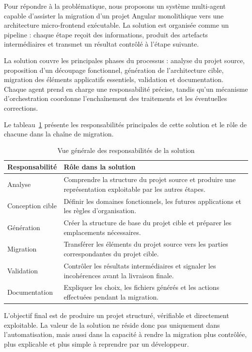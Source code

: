 Pour répondre à la problématique, nous proposons un système multi-agent capable d'assister la migration d'un projet Angular monolithique vers une architecture micro-frontend exécutable. La solution est organisée comme un pipeline : chaque étape reçoit des informations, produit des artefacts intermédiaires et transmet un résultat contrôlé à l'étape suivante.

La solution couvre les principales phases du processus : analyse du projet source, proposition d'un découpage fonctionnel, génération de l'architecture cible, migration des éléments applicatifs essentiels, validation et documentation. Chaque agent prend en charge une responsabilité précise, tandis qu'un mécanisme d'orchestration coordonne l'enchaînement des traitements et les éventuelles corrections.

Le tableau~\ref{tab:responsabilites-solution} présente les responsabilités principales de cette solution et le rôle de chacune dans la chaîne de migration.

\begingroup
\renewcommand{\arraystretch}{1.25}
\begin{longtable}{|p{4cm}|p{10cm}|}
\caption{Vue générale des responsabilités de la solution}\label{tab:responsabilites-solution}\\
\hline
\textbf{Responsabilité} & \textbf{Rôle dans la solution} \\
\hline
Analyse & Comprendre la structure du projet source et produire une représentation exploitable par les autres étapes. \\
\hline
Conception cible & Définir les domaines fonctionnels, les futures applications et les règles d'organisation. \\
\hline
Génération & Créer la structure de base du projet cible et préparer les emplacements nécessaires. \\
\hline
Migration & Transférer les éléments du projet source vers les parties correspondantes du projet cible. \\
\hline
Validation & Contrôler les résultats intermédiaires et signaler les incohérences avant la livraison finale. \\
\hline
Documentation & Expliquer les choix, les fichiers générés et les actions effectuées pendant la migration. \\
\hline
\end{longtable}
\endgroup

L'objectif final est de produire un projet structuré, vérifiable et directement exploitable. La valeur de la solution ne réside donc pas uniquement dans l'automatisation, mais aussi dans la capacité à rendre la migration plus contrôlée, plus explicable et plus simple à reprendre par un développeur.

